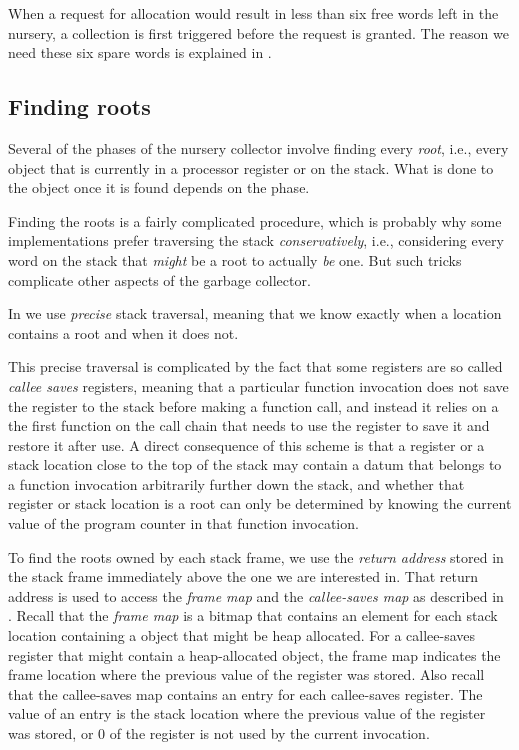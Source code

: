 When a request for allocation would result in less than six free words
left in the nursery, a collection is first triggered before the
request is granted.  The reason we need these six spare words is
explained in .

\subsection{Finding roots}
\label{sec-garbage-collection-finding-roots}

Several of the phases of the nursery collector involve finding every
\emph{root}, i.e., every \commonlisp{} object that is currently in a
processor register or on the stack.  What is done to the object once
it is found depends on the phase.

Finding the roots is a fairly complicated procedure, which is probably
why some implementations prefer traversing the stack
\emph{conservatively}, i.e., considering every word on the stack that
\emph{might} be a root to actually \emph{be} one.  But such tricks
complicate other aspects of the garbage collector.

In \sysname{} we use \emph{precise} stack traversal, meaning that we
know exactly when a location contains a root and when it does not.

This precise traversal is complicated by the fact that some registers
are so called \emph{callee saves} registers, meaning that a particular
function invocation does not save the register to the stack before
making a function call, and instead it relies on a the first function
on the call chain that needs to use the register to save it and
restore it after use.  A direct consequence of this scheme is that a
register or a stack location close to the top of the stack may contain
a datum that belongs to a function invocation arbitrarily further down
the stack, and whether that register or stack location is a root can
only be determined by knowing the current value of the program counter
in that function invocation.

To find the roots owned by each stack frame, we use the \emph{return
  address} stored in the stack frame immediately above the one we are
interested in.  That return address is used to access the \emph{frame
  map} and the \emph{callee-saves map} as described in
.  Recall that the
\emph{frame map} is a bitmap that contains an element for each stack
location containing a \commonlisp{} object that might be heap
allocated.  For a callee-saves register that might contain a
heap-allocated \commonlisp{} object, the frame map indicates the frame
location where the previous value of the register was stored.  Also
recall that the callee-saves map contains an entry for each
callee-saves register.  The value of an entry is the stack location
where the previous value of the register was stored, or $0$ of the
register is not used by the current invocation.

